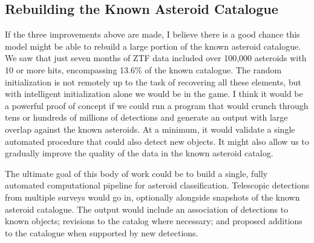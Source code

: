 \subsection{Rebuilding the Known Asteroid Catalogue}
If the three improvements above are made, I believe there is a good chance this model might be able to rebuild a large portion of the known asteroid catalogue.
We saw that just seven months of ZTF data included over 100,000 asteroids with 10 or more hits, encompassing 13.6\% of the known catalogue.
The random initialization is not remotely up to the task of recovering all these elements, but with intelligent initialization alone we would be in the game.
I think it would be a powerful proof of concept if we could run a program that would crunch through tens or hundreds of millions of detections and
generate an output with large overlap against the known asteroids.
At a minimum, it would validate a single automated procedure that could also detect new objects.
It might also allow us to gradually improve the quality of the data in the known asteroid catalog.

The ultimate goal of this body of work could be to build a single, fully automated computational pipeline for asteroid classification.
Telescopic detections from multiple surveys would go in, optionally alongside snapshots of the known asteroid catalogue.
The output would include an association of detections to known objects; revisions to the catalog where necessary; 
and proposed additions to the catalogue when supported by new detections.